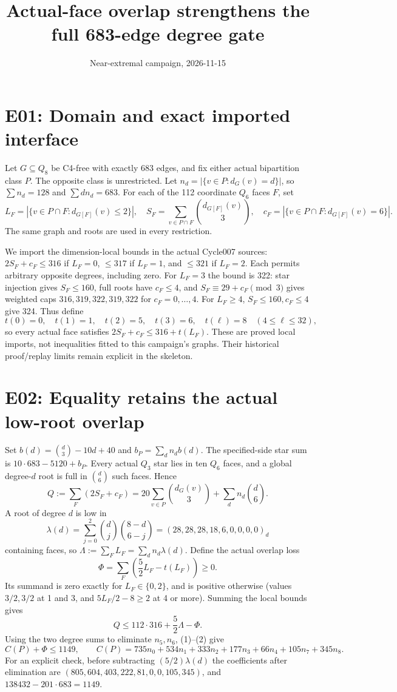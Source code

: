 \documentclass{article}
\begin{document}
\title{Actual-face overlap strengthens the full 683-edge degree gate}
\author{Near-extremal campaign, 2026-11-15}
\maketitle

\section{E01: Domain and exact imported interface}
Let $G\subseteq Q_8$ be C4-free with exactly 683 edges, and fix either
actual bipartition class $P$. The opposite class is unrestricted.
Let $n_d=|\{v\in P:d_G(v)=d\}|$, so $\sum n_d=128$ and
$\sum d n_d=683$. For each of the 112 coordinate $Q_6$ faces $F$, set
\[
 L_F=|\{v\in P\cap F:d_{G[F]}(v)\le2\}|,\quad
 S_F=\sum_{v\in P\cap F}\binom{d_{G[F]}(v)}3,\quad
 c_F=|\{v\in P\cap F:d_{G[F]}(v)=6\}|.
\]
The same graph and roots are used in every restriction.

We import the dimension-local bounds in the actual Cycle007 sources:
$2S_F+c_F\le316$ if $L_F=0$, $\le317$ if $L_F=1$, and
$\le321$ if $L_F=2$. Each permits arbitrary opposite degrees, including
zero. For $L_F=3$ the bound is 322: star injection gives $S_F\le160$,
full roots have $c_F\le4$, and
$S_F\equiv29+c_F\pmod3$ gives weighted caps $316,319,322,319,322$
for $c_F=0,\ldots,4$. For $L_F\ge4$, $S_F\le160,c_F\le4$ give 324.
Thus define
\[
 t(0)=0,\quad t(1)=1,\quad t(2)=5,\quad t(3)=6,
 \quad t(\ell)=8\quad(4\le\ell\le32),
\]
so every actual face satisfies $2S_F+c_F\le316+t(L_F)$.
These are proved local imports, not inequalities fitted to this campaign's
graphs. Their historical proof/replay limits remain explicit in the skeleton.

\section{E02: Equality retains the actual low-root overlap}
Set $b(d)=\binom d3-10d+40$ and $b_P=\sum_dn_db(d)$.
The specified-side star sum is $10\cdot683-5120+b_P$.
Every actual $Q_3$ star lies in ten $Q_6$ faces, and a global degree-$d$
root is full in $\binom d6$ such faces. Hence
\[
 Q:=\sum_F(2S_F+c_F)=20\sum_{v\in P}\binom{d_G(v)}3
                        +\sum_dn_d\binom d6.                 \tag{1}
\]
A root of degree $d$ is low in
\[
 \lambda(d)=\sum_{j=0}^2\binom dj\binom{8-d}{6-j}
 =(28,28,28,18,6,0,0,0,0)_d
\]
containing faces, so $\Lambda:=\sum_FL_F=\sum_dn_d\lambda(d)$.
Define the actual overlap loss
\[
 \Phi=\sum_F\left(\frac52 L_F-t(L_F)\right)\ge0.
\]
Its summand is zero exactly for $L_F\in\{0,2\}$, and is positive
otherwise (values $3/2,3/2$ at 1 and 3, and $5L_F/2-8\ge2$ at 4 or more).
Summing the local bounds gives
\[
 Q\le112\cdot316+\frac52\Lambda-\Phi.                       \tag{2}
\]
Using the two degree sums to eliminate $n_5,n_6$, (1)--(2) give
\[
 C(P)+\Phi\le1149,\qquad
 C(P)=735n_0+534n_1+333n_2+177n_3+66n_4+105n_7+345n_8.       \tag{3}
\]
For an explicit check, before subtracting $(5/2)\lambda(d)$ the
coefficients after elimination are
$(805,604,403,222,81,0,0,105,345)$, and
$138432-201\cdot683=1149$.
\end{document}
